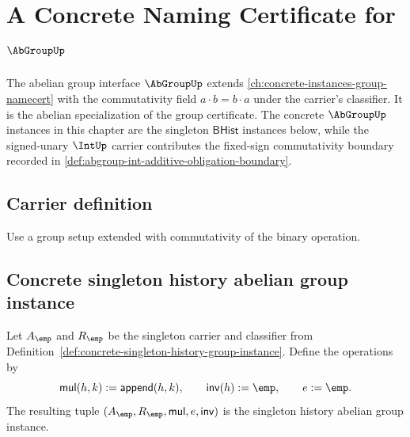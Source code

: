 \chapter{A Concrete Naming Certificate for \(\AbGroupUp\)}
\label{ch:concrete-instances-abgroup-namecert}

The abelian group interface $\AbGroupUp$ extends \autoref{ch:concrete-instances-group-namecert} with the commutativity field $a \cdot b = b \cdot a$ under the carrier's classifier. It is the abelian specialization of the group certificate. The concrete $\AbGroupUp$ instances in this chapter are the singleton $\mathsf{BHist}$ instances below, while the signed-unary $\IntUp$ carrier contributes the fixed-sign commutativity boundary recorded in \autoref{def:abgroup-int-additive-obligation-boundary}.

\section{Carrier definition}

\begin{definition}
\label{def:abgroup-carrier}
Use a group setup extended with commutativity of the binary operation.
\end{definition}

\section{Concrete singleton history abelian group instance}
\label{sec:abgroup-concrete-singleton-history-instance}

\begin{definition}
\label{def:concrete-singleton-history-abgroup-instance}
Let $A_{\emp}$ and $R_{\emp}$ be the singleton carrier and classifier from
Definition~\ref{def:concrete-singleton-history-group-instance}. Define
the operations by
$$
\mathsf{mul}(h,k):=\mathsf{append}(h,k),\qquad
\mathsf{inv}(h):=\emp,\qquad
e:=\emp.
$$
The resulting tuple $(A_{\emp},R_{\emp},\mathsf{mul},e,\mathsf{inv})$ is the
singleton history abelian group instance.
\end{definition}

